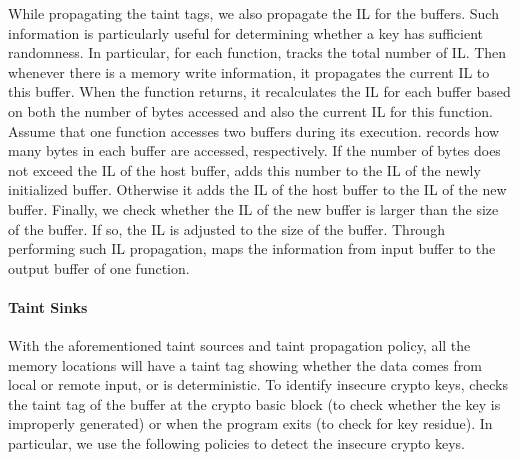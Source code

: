 {%

{
While propagating the taint tags, we also propagate the IL for the buffers. Such information is particularly useful for determining whether a key has sufficient randomness. In particular, for each function, \sysname tracks the total number of IL. Then whenever there is a memory write information, it propagates the current IL to this buffer. When the function returns, it recalculates the IL for each buffer based on both the number of bytes accessed and also the current IL for this function. 
Assume that one function accesses two buffers during its execution.
\sysname records how many bytes in each buffer are accessed, respectively.
If the number of bytes does not exceed the IL of the host buffer,
	\sysname adds this number to the IL of the newly initialized buffer.
Otherwise it adds the IL of the host buffer to the IL of the new buffer.
Finally, we check whether the IL of the new buffer is larger than the size of the buffer.
If so, the IL is adjusted to the size of the buffer.
Through performing such IL propagation, \sysname maps the information from input buffer to the output buffer of one function.
 }




\paragraph{Taint Sinks} With the aforementioned taint sources and taint propagation policy, all the memory locations will have a taint tag showing whether the data comes from local or remote input, or is deterministic. 
To identify insecure crypto keys, 
\sysname checks the taint tag of the buffer at the crypto basic block (to check whether the key is improperly generated) or when the program exits (to check for key residue). 
In particular, we use the following policies to detect the insecure crypto keys.

}
